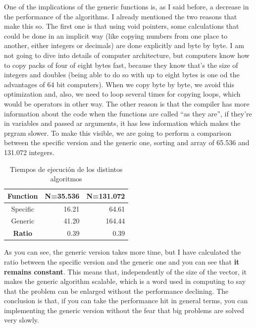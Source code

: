 \documentclass[a4paper]{article}
\begin{document}
One of the implications of the generic functions is, as I said before, a
decrease in the performance of the algorithms. I already mentioned the two
reasons that make this so. The first one is that using void pointers, some
calculations that could be done in an implicit way (like copying numbers from
one place to another, either integers or decimals) are done explicitly and byte
by byte. I am not going to dive into details of computer architecture, but
computers know how to copy packs of four of eight bytes fast, because they know
that's the size of integers and doubles (being able to do so with up to eight
bytes is one od the advantages of 64 bit computers). When we copy byte by byte,
we avoid this optimization and, also, we need to loop several times for copying
loops, which would be operators in other way. The other reason is that the
compiler has more information about the code when the functions are called
``as they are'', if they're in variables and passed ar arguments, it has less
information which makes the prgram slower. To make this visible, we are going to
perform a comparison between the specific version and the generic one, sorting
and array of 65.536 and 131.072 integers.

\begin{table}[H]
\begin{tabularx}{\linewidth}{|c|R|R|}
\hline
\textbf{Function}&\textbf{N=35.536}&\textbf{N=131.072}\\\hline
Specific&16.21&64.61\\\hline
Generic&41.20&164.44\\\hline
\textbf{Ratio}&0.39&0.39\\\hline
\end{tabularx}
\caption{Tiempos de ejecución de los distintos algoritmos}
\label{tab:sortingTimes}
\end{table}

As you can see, the generic version takes more time, but I have calculated the
ratio between the specific version and the generic one and you can see that
\textbf{it remains constant}. This means that, independently of the size of
the vector, it makes the generic algorithm scalable, which is a word used in
computing to say that the problem can be enlarged without the performance
declining. The conclusion is that, if you can take the performance hit in
general terms, you can implementing the generic version without the fear that
big problems are solved very slowly.

\end{document}

